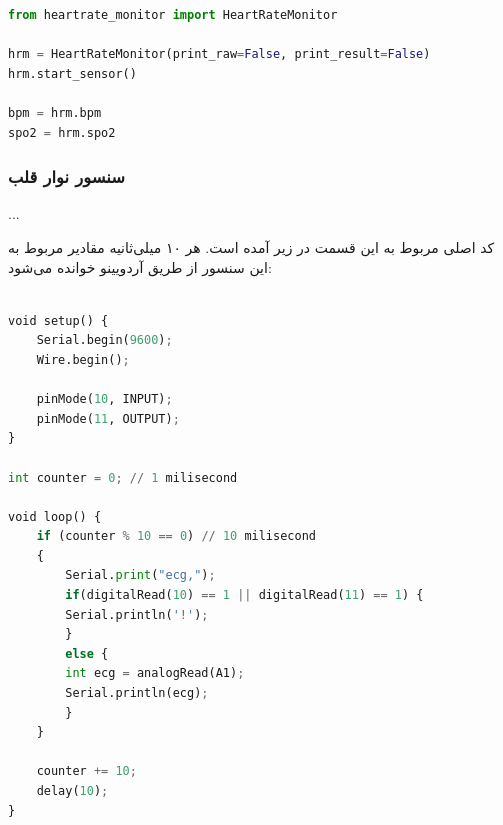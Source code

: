 \begin{latin}
	\begin{lstlisting}[language=python]
from heartrate_monitor import HeartRateMonitor

hrm = HeartRateMonitor(print_raw=False, print_result=False)
hrm.start_sensor()

bpm = hrm.bpm
spo2 = hrm.spo2

	\end{lstlisting}
\end{latin}

\subsubsection{سنسور نوار قلب}

...

کد اصلی مربوط به این قسمت در زیر آمده است. هر ۱۰ میلی‌ثانیه مقادیر مربوط به این سنسور از طریق آردویینو خوانده می‌شود:

\begin{latin}
	\begin{lstlisting}[language=python]

void setup() {
	Serial.begin(9600);
	Wire.begin();

	pinMode(10, INPUT);
	pinMode(11, OUTPUT);
}

int counter = 0; // 1 milisecond

void loop() {
	if (counter % 10 == 0) // 10 milisecond
	{
		Serial.print("ecg,");
		if(digitalRead(10) == 1 || digitalRead(11) == 1) {
		Serial.println('!');
		}
		else {
		int ecg = analogRead(A1);
		Serial.println(ecg);
		}  
	}
		
	counter += 10;
	delay(10);
}

	\end{lstlisting}
\end{latin}